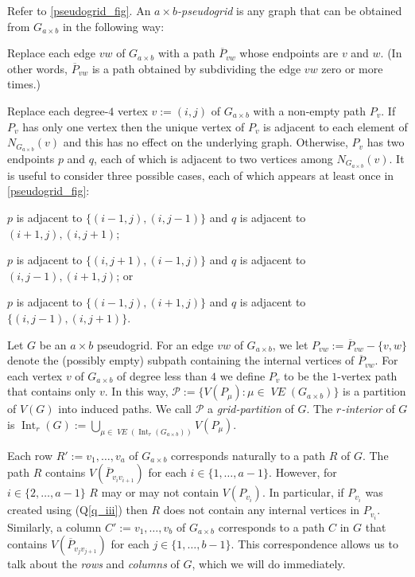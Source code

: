 \documentclass{patmorin}
\DeclareMathOperator{\interior}{Int}
\newcommand{\defin}[1]{\emph{\color{brightmaroon}#1}}
\DeclareMathOperator{\VE}{\mathit{VE}}
\begin{document}
Refer to \cref{pseudogrid_fig}.  An \defin{$a\times b$-pseudogrid} is any graph that can be obtained from $G_{a\times b}$ in the following way:
\begin{compactitem}
  \item Replace each edge $vw$ of $G_{a\times b}$ with a path $\overline{P}_{vw}$ whose endpoints are $v$ and $w$.  (In other words, $\overline{P}_{vw}$ is a path obtained by subdividing the edge $vw$ zero or more times.)
  \item Replace each degree-$4$ vertex $v:=(i,j)$ of $G_{a\times b}$ with a non-empty path $P_v$. If $P_v$ has only one vertex then the unique vertex of $P_v$ is adjacent to each element of $N_{G_{a\times b}}(v)$ and this has no effect on the underlying graph.  Otherwise, $P_v$ has two endpoints $p$ and $q$, each of which is adjacent to two vertices among $N_{G_{a\times b}}(v)$.  It is useful to consider three possible cases, each of which appears at least once in \cref{pseudogrid_fig}:
  \begin{compactenum}[(Q1)]
    \item \label{q_i} $p$ is adjacent to $\{(i-1,j), (i,j-1)\}$ and $q$ is adjacent to $(i+1,j),(i,j+1)$;
    \item \label{q_ii} $p$ is adjacent to $\{(i,j+1), (i-1,j)\}$ and $q$ is adjacent to $(i,j-1),(i+1,j)$; or
    \item \label{q_iii} $p$ is adjacent to $\{(i-1,j),(i+1,j)\}$ and $q$ is adjacent to $\{(i,j-1),(i,j+1)\}$.
  \end{compactenum}
\end{compactitem}

Let $G$ be an $a\times b$ pseudogrid.  For an edge $vw$ of $G_{a\times b}$, we let $P_{vw}:=\overline{P}_{vw}-\{v,w\}$ denote the (possibly empty) subpath containing the internal vertices of $\overline{P}_{vw}$.  For each vertex $v$ of $G_{a\times b}$ of degree less than $4$ we define $P_{v}$ to be the $1$-vertex path that contains only $v$.  In this way, $\mathcal{P}:=\{V(P_\mu):\mu\in \VE(G_{a\times b})\}$ is a partition of $V(G)$ into induced paths.  We call $\mathcal{P}$ a \defin{grid-partition} of $G$.
The \defin{$r$-interior} of $G$ is $\interior_r(G):=\bigcup_{\mu\in\VE(\interior_r(G_{a\times b}))} V(P_\mu)$.


Each row $R':=v_1,\ldots,v_a$ of $G_{a\times b}$ corresponds naturally to a path $R$ of $G$. The path $R$ contains $V(\overline{P}_{v_iv_{i+1}})$ for each $i\in\{1,\ldots,a-1\}$.  However, for $i\in\{2,\ldots,a-1\}$ $R$ may or may not contain $V(P_{v_i})$.  In particular, if $P_{v_i}$ was created using (Q\ref{q_iii}) then $R$ does not contain any internal vertices in $P_{v_i}$. Similarly, a column $C':=v_1,\ldots,v_b$ of $G_{a\times b}$ corresponds to a path $C$  in $G$ that contains $V(\overline{P}_{v_jv_{j+1}})$ for each $j\in\{1,\ldots,b-1\}$. This correspondence allows us to talk about the \defin{rows} and \defin{columns} of $G$, which we will do immediately.
\end{document}
